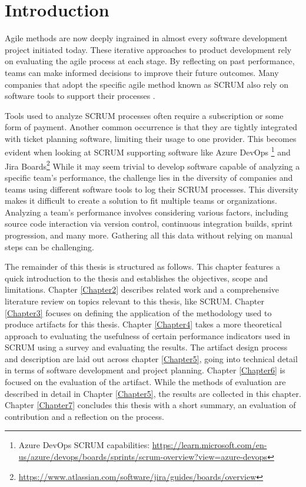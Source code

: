 \chapter{Introduction}
\label{Chapter1}

Agile methods are now deeply ingrained in almost every software development project initiated today.
These iterative approaches to product development rely on evaluating the agile 
process at each stage. By reflecting on past performance, 
teams can make informed decisions to improve their future outcomes. 
Many companies that adopt the specific agile method known as SCRUM also 
rely on software tools to support their processes \parencite{Katsma2013Can}.

Tools used to analyze SCRUM processes often require 
a subscription or some form of payment. 
Another common occurrence is that they are tightly integrated with ticket planning software, 
limiting their usage to one provider. 
This becomes evident when looking at SCRUM supporting software like Azure DevOps
\footnote{Azure DevOps SCRUM capabilities: \url{https://learn.microsoft.com/en-us/azure/devops/boards/sprints/scrum-overview?view=azure-devops}}
and Jira Boards\footnote{\url{https://www.atlassian.com/software/jira/guides/boards/overview}}
While it may seem trivial to develop software capable of analyzing a specific 
team's performance, the challenge lies in the diversity of companies and teams 
using different software tools to log their SCRUM processes. 
This diversity makes it difficult to create a solution to fit multiple teams or organizations. 
Analyzing a team's performance involves considering various factors, 
including source code interaction via version control, continuous integration builds, 
sprint progression, and many more. 
Gathering all this data without relying on manual steps can be challenging.

The remainder of this thesis is structured as follows. 
This chapter features a quick introduction to the thesis and 
establishes the objectives, scope and limitations. 
Chapter \ref{Chapter2} describes related work and a comprehensive 
literature review on topics relevant to this thesis, like SCRUM. 
Chapter \ref{Chapter3} focuses on defining the application of the 
methodology used to produce artifacts for this thesis. 
Chapter \ref{Chapter4} takes a more theoretical approach to evaluating 
the usefulness of certain performance indicators used in SCRUM using a 
survey and evaluating the results. 
The artifact design process and description are laid out across chapter \ref{Chapter5}, 
going into technical detail in terms of software development and project planning. 
Chapter \ref{Chapter6} is focused on the evaluation of the artifact. 
While the methods of evaluation are described in detail in Chapter \ref{Chapter5}, 
the results are collected in this chapter. 
Chapter \ref{Chapter7} concludes this thesis with a short summary, 
an evaluation of contribution and a reflection on the process.
 
